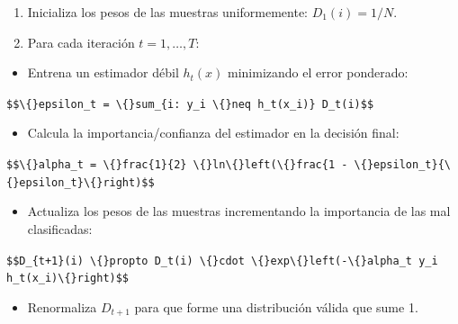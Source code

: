 \documentclass[11pt,oneside]{article}
\begin{document}
\begin{enumerate}

\item Inicializa los pesos de las muestras uniformemente: \(D_1(i) = 1/N\).

\item Para cada iteración \(t = 1, \dots, T\):

\end{enumerate}

\begin{itemize}

\item Entrena un estimador débil \(h_t(x)\) minimizando el error ponderado:

\end{itemize}

\texttt{\$\$\textbackslash\{\}epsilon\_t = \textbackslash\{\}sum\_\{i: y\_i \textbackslash\{\}neq h\_t(x\_i)\} D\_t(i)\$\$}\\

\begin{itemize}

\item Calcula la importancia/confianza del estimador en la decisión final:

\end{itemize}

\texttt{\$\$\textbackslash\{\}alpha\_t = \textbackslash\{\}frac\{1\}\{2\} \textbackslash\{\}ln\textbackslash\{\}left(\textbackslash\{\}frac\{1 - \textbackslash\{\}epsilon\_t\}\{\textbackslash\{\}epsilon\_t\}\textbackslash\{\}right)\$\$}\\

\begin{itemize}

\item Actualiza los pesos de las muestras incrementando la importancia de las mal clasificadas:

\end{itemize}

\texttt{\$\$D\_\{t+1\}(i) \textbackslash\{\}propto D\_t(i) \textbackslash\{\}cdot \textbackslash\{\}exp\textbackslash\{\}left(-\textbackslash\{\}alpha\_t y\_i h\_t(x\_i)\textbackslash\{\}right)\$\$}\\

\begin{itemize}

\item Renormaliza \(D_{t+1}\) para que forme una distribución válida que sume 1.

\end{itemize}
\end{document}
